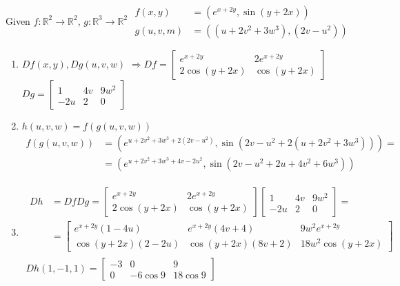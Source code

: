 \documentclass[twoside]{amsart}
\theoremstyle{plain}
\theoremstyle{definition}
\newcommand{\exercisehead}[1]
  {
   \noindent{\small\bf Exercise #1.}
   \smallskip}
\begin{document}
\exercisehead{14} Given $f: \mathbb{R}^2 \to \mathbb{R}^2$, $g: \mathbb{R}^3 \to \mathbb{R}^2$ \quad $\begin{aligned}
  f(x,y) & = (e^{x+2y}, \sin{(y+2x)}) \\
  g(u,v,m) & = ((u+2v^2 + 3w^3), (2v- u^2) )
\end{aligned}$ 
\begin{enumerate}
\item $Df(x,y), Dg(u,v,w)$ \quad $\Longrightarrow Df = \left[ \begin{matrix} e^{x+2y} & 2 e^{x + 2y} \\
    2 \cos{(y+2x)} & \cos{(y+2x)} \end{matrix} \right]$ \quad \quad $Dg = \left[ \begin{matrix} 1 & 4v & 9w^2 \\ -2u & 2 & 0 \end{matrix} \right]$ 
\item $h(u,v,w) = f(g(u,v,w))$
\[
\begin{aligned}
f(g(u,v,w)) & = (e^{u + 2v^2 + 3w^3 + 2(2v - u^2) }, \sin{( 2v - u^2 + 2(u + 2v^2 + 3w^3) ) } ) = \\
& = (e^{u + 2v^2 + 3w^3 + 4v - 2u^2 }, \sin{(2v - u^2 + 2u + 4v^2 + 6w^3 ) } ) 
\end{aligned}
\]
\item 
\[
\begin{gathered}
  \begin{aligned}
  Dh & = Df Dg = \left[ \begin{matrix} e^{x+ 2y} & 2e^{x+2y} \\
      2\cos{ (y+2x)} & \cos{(y+ 2x) } 
\end{matrix} \right]\left[ \begin{matrix} 1 & 4v & 9w^2 \\
      -2u & 2 & 0 \end{matrix} \right] = \\
  & = \left[ \begin{matrix} e^{x+2y} (1-4u) & e^{x+2y} (4v +4) & 9 w^2 e^{x+2y} \\
      \cos{(y+2x)} (2-2u) & \cos{(y+2x) }(8v + 2) & 18 w^2 \cos{(y+ 2x) } \end{matrix} \right] 
\end{aligned} \\
  Dh(1,-1,1) = \left[ \begin{matrix} -3 & 0 & 9 \\
      0 & -6 \cos{9} & 18 \cos{9} \end{matrix} \right]
\end{gathered}
\]
\end{enumerate}
\end{document}
